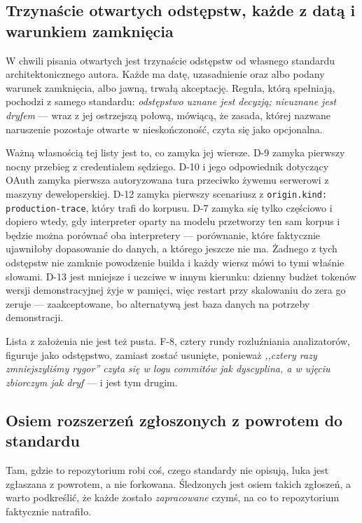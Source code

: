 \documentclass[11pt,a4paper]{article}
\begin{document}
\subsection{Trzynaście otwartych odstępstw, każde z datą i warunkiem zamknięcia}

W chwili pisania otwartych jest trzynaście odstępstw od własnego standardu
architektonicznego autora. Każde ma datę, uzasadnienie oraz albo podany warunek
zamknięcia, albo jawną, trwałą akceptację. Reguła, którą spełniają, pochodzi z
samego standardu: \emph{odstępstwo uznane jest decyzją; nieuznane jest dryfem}
--- wraz z jej ostrzejszą połową, mówiącą, że zasada, której nazwane naruszenie
pozostaje otwarte w nieskończoność, czyta się jako opcjonalna.

Ważną własnością tej listy jest to, co zamyka jej wiersze. D-9 zamyka pierwszy
nocny przebieg z credentialem sędziego. D-10 i jego odpowiednik dotyczący OAuth
zamyka pierwsza autoryzowana tura przeciwko żywemu serwerowi z maszyny
deweloperskiej. D-12 zamyka pierwszy scenariusz z
\texttt{origin.kind: production-trace}, który trafi do korpusu. D-7 zamyka się
tylko częściowo i dopiero wtedy, gdy interpreter oparty na modelu przetworzy ten
sam korpus i będzie można porównać oba interpretery --- porównanie, które
faktycznie ujawniłoby dopasowanie do danych, a którego jeszcze nie ma. Żadnego z
tych odstępstw nie zamknie powodzenie builda i każdy wiersz mówi to tymi właśnie
słowami. D-13 jest mniejsze i uczciwe w innym kierunku: dzienny budżet tokenów
wersji demonstracyjnej żyje w pamięci, więc restart przy skalowaniu do zera go
zeruje --- zaakceptowane, bo alternatywą jest baza danych na potrzeby
demonstracji.

Lista z założenia nie jest też pusta. F-8, cztery rundy rozluźniania
analizatorów, figuruje jako odstępstwo, zamiast zostać usunięte, ponieważ
\emph{,,cztery razy zmniejszyliśmy rygor'' czyta się w logu commitów jak
dyscyplina, a w ujęciu zbiorczym jak dryf} --- i jest tym drugim.

\subsection{Osiem rozszerzeń zgłoszonych z powrotem do standardu}

Tam, gdzie to repozytorium robi coś, czego standardy nie opisują, luka jest
zgłaszana z powrotem, a nie forkowana. Śledzonych jest osiem takich zgłoszeń, a
warto podkreślić, że każde zostało \emph{zapracowane} czymś, na co to
repozytorium faktycznie natrafiło.
\end{document}
